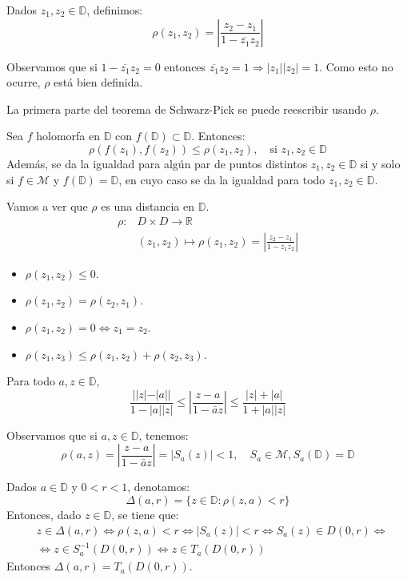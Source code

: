 \begin{definition}
    Dados $z_1, z_2 \in \mathbb{D}$, definimos:
    $$\rho(z_1, z_2) = \left|\frac{z_2-z_1}{1-\overline{z_1}z_2}\right|$$

    Observamos que si $1-\overline{z_1}z_2 = 0$ entonces $\overline{z_1}z_2 = 1 \Rightarrow |z_1||z_2| = 1$.
    Como esto no ocurre, $\rho$ está bien definida.
\end{definition}

La primera parte del teorema de Schwarz-Pick se puede reescribir usando $\rho$.

Sea $f$ holomorfa en $\mathbb{D}$ con $f(\mathbb{D}) \subset \mathbb{D}$.
Entonces:
$$\rho(f(z_1), f(z_2)) \leq \rho(z_1, z_2), \quad \text{si } z_1, z_2 \in \mathbb{D}$$
Además, se da la igualdad para algún par de puntos distintos $z_1, z_2 \in \mathbb{D}$ si y solo si $f \in \mathcal{M}$ y $f(\mathbb{D}) = \mathbb{D}$, en cuyo caso se da la igualdad para todo $z_1, z_2 \in \mathbb{D}$.

Vamos a ver que $\rho$ es una distancia en $\mathbb{D}$.
\begin{align*}
    \rho: & D \times D \to \mathbb{R}                                                            \\
          & (z_1, z_2) \mapsto \rho(z_1, z_2) = \left|\frac{z_2-z_1}{1-\overline{z_1}z_2}\right|
\end{align*}

\begin{itemize}
    \item $\rho(z_1, z_2) \leq 0$.
    \item $\rho(z_1, z_2) = \rho(z_2, z_1)$.
    \item $\rho(z_1, z_2) = 0 \Leftrightarrow z_1 = z_2$.
    \item $\rho(z_1, z_3) \leq \rho(z_1, z_2) + \rho(z_2, z_3)$.
\end{itemize}

\begin{lemma}
    Para todo $a, z \in \mathbb{D}$,
    $$\frac{||z|-|a||}{1-|a||z|} \leq \left|\frac{z-a}{1-\bar{a}z}\right| \leq \frac{|z|+|a|}{1+|a||z|}$$
\end{lemma}

Observamos que si $a, z \in \mathbb{D}$, tenemos:
$$\rho(a, z) = \left|\frac{z-a}{1-\bar{a}z}\right| = |S_a(z)| < 1, \quad S_a \in \mathcal{M}, S_a(\mathbb{D}) = \mathbb{D}$$

Dados $a \in \mathbb{D}$ y $0 < r < 1$, denotamos:
$$\Delta(a, r) = \{z \in \mathbb{D} : \rho(z, a) < r\}$$
Entonces, dado $z \in \mathbb{D}$, se tiene que:
\begin{align*}
     & z \in \Delta(a, r) \Leftrightarrow \rho(z, a) < r \Leftrightarrow |S_a(z)| < r \Leftrightarrow S_a(z) \in D(0, r) \Leftrightarrow \\
     & \Leftrightarrow z \in S_a^{-1}(D(0, r)) \Leftrightarrow z \in T_a(D(0, r))
\end{align*}
Entonces $\Delta(a, r) = T_a(D(0, r))$.

